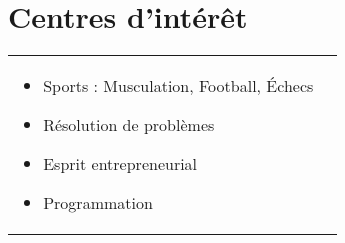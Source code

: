 \documentclass[a4paper,8pt]{article}
\begin{document}
\section{Centres d'intérêt}
\begin{tabularx}{\linewidth}{ @{}l r@{} }
\begin{minipage}[t]{\linewidth}
    \begin{itemize}[nosep,after=\strut, leftmargin=2em, itemsep=2pt]
        \item Sports : Musculation, Football, Échecs
        \item Résolution de problèmes
        \item Esprit entrepreneurial
        \item Programmation
    \end{itemize}
\end{minipage}
\end{tabularx}
\end{document}
